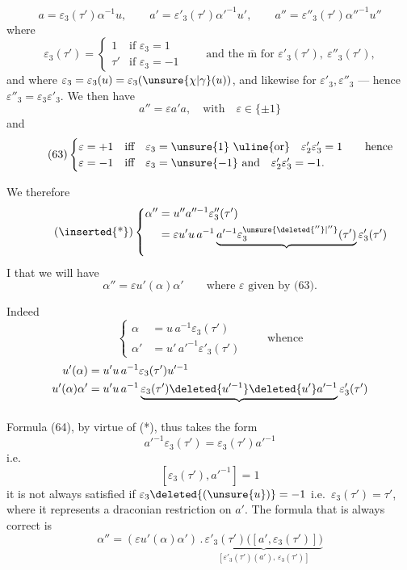 
\[
\tag{61}
a=\varepsilon_3(\tau')\alpha^{-1}u,\qquad
a'=\varepsilon'_3(\tau')\alpha'^{-1}u',\qquad
a''=\varepsilon''_3(\tau')\alpha''^{-1}u''
\]
where
\[
\varepsilon_3(\tau')=
\begin{cases}
1&\text{if }\varepsilon_3=1\\
\tau'&\text{if }\varepsilon_3=-1
\end{cases}
\qquad
\text{and the }\overline{\mathrm m}\text{ for }\varepsilon'_3(\tau'),\ \varepsilon''_3(\tau'),
\]
and where $\varepsilon_3=\varepsilon_3(u)=\varepsilon_3(\unsure{\chi|\gamma}(u))$,
and likewise for $\varepsilon'_3,\varepsilon''_3$
--- hence $\varepsilon''_3=\varepsilon_3\varepsilon'_3$. We then have
\[
\tag{62}
a''=\varepsilon a'a,\quad\text{with}\quad\varepsilon\in\{\pm1\}
\]
and
\[
\tag{63}
\begin{cases}
\varepsilon=+1&\text{iff}\quad \varepsilon_3=\unsure{1}\ \text{\uline{or}}\quad
\varepsilon'_2\varepsilon'_3=1\qquad\text{hence}\\
\varepsilon=-1&\text{iff}\quad \varepsilon_3=\unsure{-1}\ \text{and}\quad
\varepsilon'_2\varepsilon'_3=-1.
\end{cases}
\]

We  therefore
\[
\tag{\inserted{*}}
\left\{
\begin{aligned}
\alpha''&=u''a''^{-1}\varepsilon''_3(\tau')\\
&=\varepsilon u'u\,a^{-1}\underbrace{a'^{-1}\varepsilon_3^{\unsure{\deleted{''}|''}}(\tau')}_{\vphantom{A}}\varepsilon'_3(\tau')
\end{aligned}
\right.
\]
I 
 that we will have
\[
\tag{64}
\alpha''=\varepsilon u'(\alpha)\alpha'
\qquad\text{where }\varepsilon\text{ given by (63).}
\]

Indeed
\[
\left\{
\begin{aligned}
\alpha&=u\,a^{-1}\varepsilon_3(\tau')\\
\alpha'&=u'\,a'^{-1}\varepsilon'_3(\tau')
\end{aligned}
\right.
\qquad\text{whence}
\]
\[
\begin{aligned}
u'(\alpha)&=u'u\,a^{-1}\varepsilon_3(\tau')u'^{-1}\\
u'(\alpha)\alpha'&=u'u\,a^{-1}
\underbrace{\varepsilon_3(\tau')\deleted{u'^{-1}}\deleted{u'}a'^{-1}}_{\vphantom{A}}
\varepsilon'_3(\tau')
\end{aligned}
\]
Formula (64), by virtue of (*), thus takes the form
\[
a'^{-1}\varepsilon_3(\tau')=\varepsilon_3(\tau')a'^{-1}
\]
i.e.
\[
[\varepsilon_3(\tau'),a'^{-1}]=1
\]
it is not always satisfied if $\varepsilon_3\deleted{(\unsure{u})}=-1$
i.e.\ $\varepsilon_3(\tau')=\tau'$, where it represents  a
draconian restriction on $a'$. The formula that is always correct is
\[
\alpha''=(\varepsilon u'(\alpha)\alpha')\mathbin{.}
\underbrace{\varepsilon'_3(\tau')\bigl([a',\varepsilon_3(\tau')]\bigr)}_{[\varepsilon'_3(\tau')(a'),\,\varepsilon_3(\tau')]}
\]
